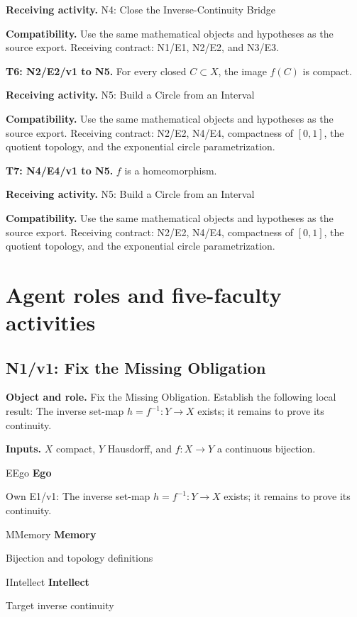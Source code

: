 \documentclass[preprint,12pt,aps,pra,showkeys,amsmath,amssymb,superscriptaddress,floatfix]{revtex4-2}
\theoremstyle{definition}
\theoremstyle{remark}
\newcommand{\mmfaculty}[3]{%
 \begin{mmfacultybox}{#1}{#2}
 {\sffamily\bfseries\color{MMBlue}#2}\par\smallskip #3
 \end{mmfacultybox}}
\newcommand{\field}[2]{\par\smallskip\noindent\textbf{#1.} #2\par}
\begin{document}
\field{Receiving activity}{N4: Close the Inverse-Continuity Bridge}

\field{Compatibility}{Use the same mathematical objects and hypotheses as the source export.
Receiving contract: N1/E1, N2/E2, and N3/E3.}

\field{T6: N2/E2/v1 to N5}{For every closed \(C\subset X\), the image \(f(C)\) is compact.}

\field{Receiving activity}{N5: Build a Circle from an Interval}

\field{Compatibility}{Use the same mathematical objects and hypotheses as the source export.
Receiving contract: N2/E2, N4/E4, compactness of \([0,1]\), the quotient
topology, and the exponential circle parametrization.}

\field{T7: N4/E4/v1 to N5}{\(f\) is a homeomorphism.}

\field{Receiving activity}{N5: Build a Circle from an Interval}

\field{Compatibility}{Use the same mathematical objects and hypotheses as the source export.
Receiving contract: N2/E2, N4/E4, compactness of \([0,1]\), the quotient
topology, and the exponential circle parametrization.}

\endgroup

\clearpage\section{Agent roles and five-faculty activities}\begingroup\small\linespread{1.05}\selectfont{}

\subsection{N1/v1: Fix the Missing Obligation}

\field{Object and role}{Fix the Missing Obligation. Establish the following local result: The
inverse set-map \(h=f^{-1}:Y\to X\) exists; it remains to prove its
continuity.}

\field{Inputs}{\(X\) compact, \(Y\) Hausdorff, and \(f:X\to Y\) a continuous bijection.}

\mmfaculty{E}{Ego}{Own E1/v1: The inverse set-map \(h=f^{-1}:Y\to X\) exists; it remains to
prove its continuity.}

\mmfaculty{M}{Memory}{Bijection and topology definitions}

\mmfaculty{I}{Intellect}{Target inverse continuity}
\end{document}
